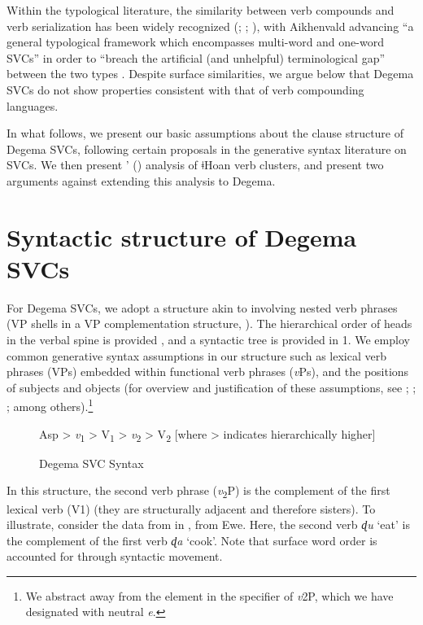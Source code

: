 \documentclass[output=paper]{langsci/langscibook}
\begin{document}
Within the typological literature, the similarity between verb compounds and verb serialization has been widely recognized (\citealt[101]{Margetts1999}; \citealt[18]{Crowley2002}; \citealt[a.o.]{Aikhenvald2006}), with Aikhenvald advancing “a general typological framework which encompasses multi-word and one-word SVCs” in order to “breach the artificial (and unhelpful) terminological gap” between the two types \citep[38]{Aikhenvald2006}. Despite surface similarities, we argue below that Degema SVCs do not show properties consistent with that of verb compounding languages. 

In what follows, we present our basic assumptions about the clause structure of Degema SVCs, following certain proposals in the generative syntax literature on SVCs. We then present \citeauthor{Collins2002}’ (\citeyear*{collins2002}) analysis of ǂHoan verb clusters, and present two arguments against extending this analysis to Degema. 

\section{Syntactic structure of Degema SVCs}
For Degema SVCs, we adopt a structure akin to \citet{Collins1997,Collins2002} involving nested verb phrases (VP shells in a VP complementation structure, \citealt{ClearyKemp2015}). The hierarchical order of heads in the verbal spine is provided , and a syntactic tree is provided in 1. We employ common generative syntax assumptions in our structure such as lexical verb phrases (VPs) embedded within functional verb phrases (\textit{v}Ps), and the positions of subjects and objects (for overview and justification of these assumptions, see \citealt{Chomsky1995}; \citealt{Adger2003}; \citealt{Radford2004}; among others).\footnote{We abstract away from the element in the specifier of \textit{v}2P, which we have designated with neutral \textit{e}.
}

\begin{figure}
 
Asp > \textit{v}\textsubscript{1} > V\textsubscript{1} > \textit{v}\textsubscript{2} > V\textsubscript{2}
[where > indicates hierarchically higher]
\label{bkm:Ref449436541}
  
\caption{Degema SVC Syntax}
\end{figure}

In this structure, the second verb phrase (\textit{v}\textsubscript{2}P) is the complement of the first lexical verb (V1) (they are structurally adjacent and therefore sisters). To illustrate, consider the data from \citet{Collins1997} in , from Ewe. Here, the second verb \textit{ɖu} ‘eat’ is the complement of the first verb\textit{ ɖa} ‘cook’. Note that surface word order is accounted for through syntactic movement.
\end{document}

